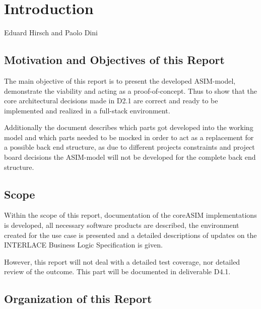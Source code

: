 \chapter{Introduction}
\label{ch:Introduction}

\vspace{-1cm}
\begin{center}
Eduard Hirsch and Paolo Dini
\end{center}


\section{Motivation and Objectives of this Report}

The main objective of this report is to present the developed ASIM-model,
demonstrate the viability and acting as a proof-of-concept. Thus to show
that the core architectural decisions made in D2.1 are correct and ready to be
implemented and realized in a full-stack environment.

Additionally the document describes which parts got developed into
the working model and which parts needed to be mocked in order to act as
a replacement for a possible back end structure, as due to different
projects constraints and project board decisions the ASIM-model will
not be developed for the complete back end structure.

\section{Scope}

Within the scope of this report, documentation of the coreASIM implementations
is developed, all necessary software products are described, the environment
created for the use case is presented and a detailed descriptions of updates on the
INTERLACE Business Logic Specification is given.

However, this report will not deal with a detailed test coverage, nor detailed
review of the outcome. This part will be documented in deliverable D4.1.

\section{Organization of this Report}


\newpage
